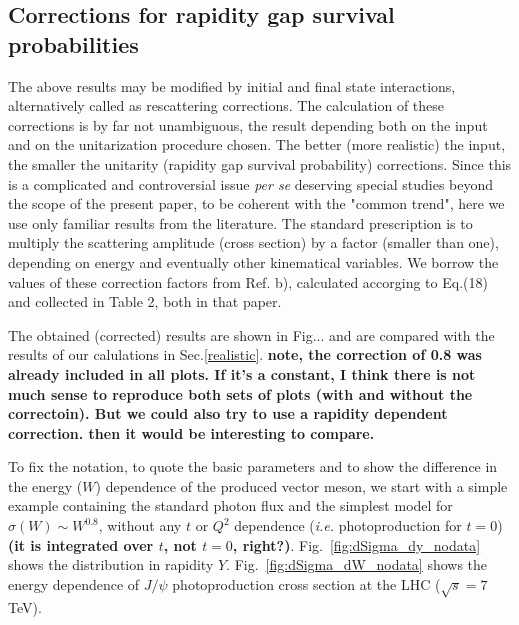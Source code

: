 \documentclass[12pt]{article}
\begin{document}
\subsection{Corrections for rapidity gap survival probabilities}\label{corrections}
The above results may be modified by initial and final state interactions,
alternatively called as rescattering corrections. The calculation of these
corrections is by far not unambiguous, the result depending both on the input
and on the unitarization procedure chosen. The better (more realistic) the input, the smaller the unitarity (rapidity gap survival probability) corrections.
Since this is a complicated and controversial issue {\it per se} deserving special studies beyond the scope of the present paper, to be coherent with the "common trend", here we use only familiar results from the literature. The standard prescription is to multiply the scattering amplitude (cross section) by a factor (smaller than one), depending on energy and eventually other kinematical variables.
We borrow the values of these correction factors from Ref.\cite{Ryskin} b), calculated accorging to Eq.(18) and collected in Table 2, both in that paper.

The obtained (corrected) results are shown in Fig... and are compared with the results of our calulations in Sec.\ref{realistic}.
{\tiny\bf note, the correction of 0.8 was already included in all plots. If it's a constant, I think there is not much sense to reproduce both sets of plots (with and without the correctoin). But we could also try to use a rapidity dependent correction. then it would be interesting to compare.}


To fix the notation, to quote the basic parameters and to show the difference in the energy ($W$) dependence of the produced vector meson, we start with a simple example containing the standard photon flux and the simplest model for $\sigma(W)\sim W^{0.8}$, without any $t$ or $Q^2$ dependence ({\it i.e.} photoproduction for $t=0$) {\tiny\bf(it is integrated over $t$, not $t=0$, right?)}.
Fig.~\ref{fig:dSigma_dy_nodata} shows the distribution in rapidity $Y$. Fig.~\ref{fig:dSigma_dW_nodata} shows the energy dependence of $J/\psi$ photoproduction cross section at the LHC ($\sqrt{s}=7$ TeV).
\end{document}

